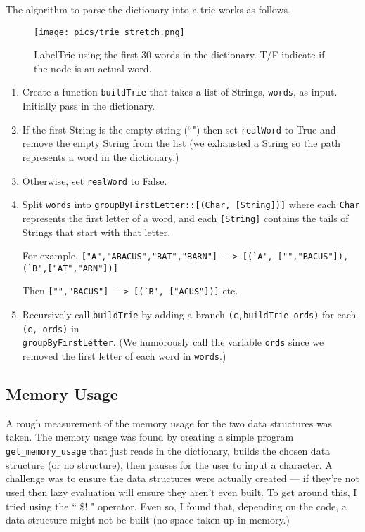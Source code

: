 \documentclass{article}
\begin{document}
The algorithm to parse the dictionary into a trie works as follows. 

\begin{figure}[h!tp] 
\centering
\texttt{[image: pics/trie\_stretch.png]} 
\caption{LabelTrie using the first 30 words in the dictionary. T/F indicate if the node is an actual word.}
\label{fig:trie_pic}
\end{figure}

\begin{enumerate}
\item Create a function \verb=buildTrie= that takes a list of Strings, \verb=words=, as input. Initially pass in the dictionary. 
\item If the first String is the empty string (``") then set \verb=realWord= to True and remove the empty String from the list (we exhausted a String so the path represents a word in the dictionary.)
\item Otherwise, set \verb=realWord= to False.

\item Split \verb=words= into \verb=groupByFirstLetter::[(Char, [String])]=  where each \verb=Char= represents the first letter of a word, and each \verb=[String]= contains the tails of Strings that start with that letter.

For example, \verb=["A","ABACUS","BAT","BARN"] --> [(`A', ["","BACUS"]), (`B',["AT","ARN"])]= 

Then \verb=["","BACUS"] --> [(`B', ["ACUS"])]= etc.

\item Recursively call \verb=buildTrie= by adding a branch \verb=(c,buildTrie ords)= for each \verb=(c, ords)= in \\ 
\verb=groupByFirstLetter=. (We humorously call the variable \verb=ords= since we removed the first letter of each word in \verb=words=.)
\end{enumerate}

\subsection{Memory Usage}

A rough measurement of the memory usage for the two data structures was taken. The memory usage was found by creating a simple program \verb=get_memory_usage= that just reads in the dictionary, builds the chosen data structure (or no structure), then pauses for the user to input a character. A challenge was to ensure the data structures were actually created --- if they're not used then lazy evaluation will ensure they aren't even built. To get around this, I tried using the `` \$! " operator. Even so, I found that, depending on the code, a data structure might not be built (no space taken up in memory.) 
\end{document}

